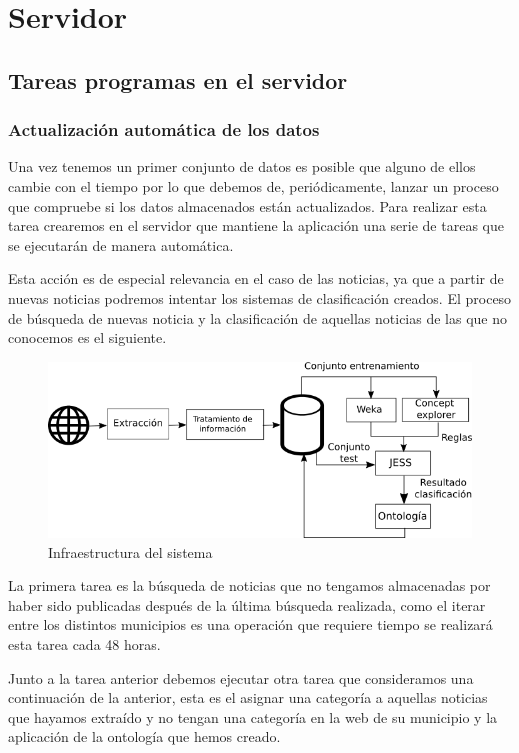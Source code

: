 \chapter{Servidor}
\section{Tareas programas en el servidor}
\subsection{Actualización automática de los datos}
Una vez tenemos un primer conjunto de datos es posible que alguno de ellos cambie con el tiempo por lo que debemos de, periódicamente, lanzar un proceso que compruebe si los datos almacenados están actualizados. Para realizar esta tarea crearemos en el servidor que mantiene la aplicación una serie de tareas que se ejecutarán de manera automática.

Esta acción es de especial relevancia en el caso de las noticias, ya que a partir de nuevas noticias podremos intentar los sistemas de clasificación creados. El proceso de búsqueda de nuevas noticia y la clasificación de aquellas noticias de las que no conocemos es el siguiente.

\begin{center}
\begin{figure}[h]
\includegraphics[width=\textwidth]{cron/drawing2.png}
\caption{Infraestructura del sistema}
\end{figure}
\end{center}

La primera tarea es la búsqueda de noticias que no tengamos almacenadas por haber sido publicadas después de la última búsqueda realizada, como el iterar entre los distintos municipios es una operación que requiere tiempo se realizará esta tarea cada 48 horas.

Junto a la tarea anterior debemos ejecutar otra tarea que consideramos una continuación de la anterior, esta es el asignar una categoría a aquellas noticias que hayamos extraído y no tengan una categoría en la web de su municipio y la aplicación de la ontología que hemos creado.

